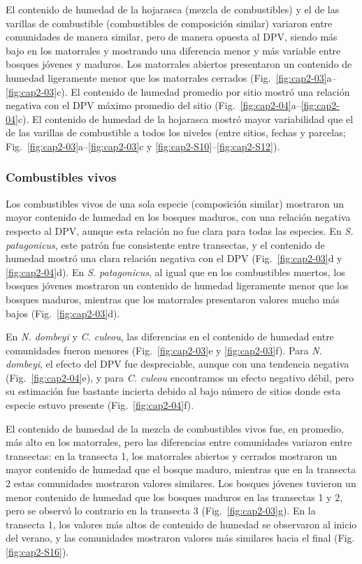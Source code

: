 El contenido de humedad de la hojarasca (mezcla de combustibles) y el de las varillas de combustible (combustibles de composición similar) variaron entre comunidades de manera similar, pero de manera opuesta al DPV, siendo más bajo en los matorrales y mostrando una diferencia menor y más variable entre bosques jóvenes y maduros. Los matorrales abiertos presentaron un contenido de humedad ligeramente menor que los matorrales cerrados (Fig.~\ref{fig:cap2-03}a–\ref{fig:cap2-03}c). El contenido de humedad promedio por sitio mostró una relación negativa con el DPV máximo promedio del sitio (Fig.~\ref{fig:cap2-04}a–\ref{fig:cap2-04}c). El contenido de humedad de la hojarasca mostró mayor variabilidad que el de las varillas de combustible a todos los niveles (entre sitios, fechas y parcelas; Fig.~\ref{fig:cap2-03}a–\ref{fig:cap2-03}c y \ref{fig:cap2-S10}–\ref{fig:cap2-S12}).

\subsubsection{Combustibles vivos}

Los combustibles vivos de una sola especie (composición similar) mostraron un mayor contenido de humedad en los bosques maduros, con una relación negativa respecto al DPV, aunque esta relación no fue clara para todas las especies. En \textit{S. patagonicus}, este patrón fue consistente entre transectas, y el contenido de humedad mostró una clara relación negativa con el DPV (Fig.~\ref{fig:cap2-03}d y \ref{fig:cap2-04}d). En \textit{S. patagonicus}, al igual que en los combustibles muertos, los bosques jóvenes mostraron un contenido de humedad ligeramente menor que los bosques maduros, mientras que los matorrales presentaron valores mucho más bajos (Fig.~\ref{fig:cap2-03}d).

En \textit{N. dombeyi} y \textit{C. culeou}, las diferencias en el contenido de humedad entre comunidades fueron menores (Fig.~\ref{fig:cap2-03}e y \ref{fig:cap2-03}f). Para \textit{N. dombeyi}, el efecto del DPV fue despreciable, aunque con una tendencia negativa (Fig.~\ref{fig:cap2-04}e), y para \textit{C. culeou} encontramos un efecto negativo débil, pero su estimación fue bastante incierta debido al bajo número de sitios donde esta especie estuvo presente (Fig.~\ref{fig:cap2-04}f).

El contenido de humedad de la mezcla de combustibles vivos fue, en promedio, más alto en los matorrales, pero las diferencias entre comunidades variaron entre transectas: en la transecta 1, los matorrales abiertos y cerrados mostraron un mayor contenido de humedad que el bosque maduro, mientras que en la transecta 2 estas comunidades mostraron valores similares. Los bosques jóvenes tuvieron un menor contenido de humedad que los bosques maduros en las transectas 1 y 2, pero se observó lo contrario en la transecta 3 (Fig.~\ref{fig:cap2-03}g). En la transecta 1, los valores más altos de contenido de humedad se observaron al inicio del verano, y las comunidades mostraron valores más similares hacia el final (Fig. \ref{fig:cap2-S16}).

